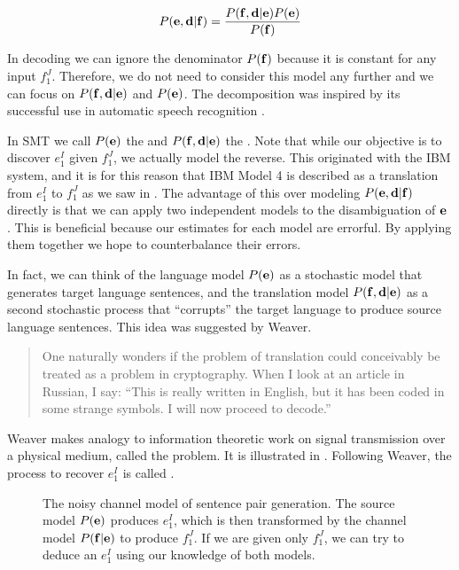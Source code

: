 \begin{equation}\label{eq:bayes}
P({\bf e},{\bf d}|{\bf f}) = \frac{P({\bf f},{\bf d}|{\bf e})P({\bf e})}{P({\bf f})}
\end{equation}

\noindent In decoding we can 
ignore the denominator $P({\bf f})$
because it is constant for any input $f_1^J$.  Therefore, we do not
need to consider this model any further and we can focus on 
$P({\bf f},{\bf d}|{\bf e})$ and $P({\bf e})$.
The decomposition was inspired by its successful
use in automatic speech recognition
\citep{Brown:1990:cl}.

In SMT we call $P({\bf e})$ the 
and $P({\bf f},{\bf d}|{\bf e})$ the .
Note that while our objective is to discover 
$e_1^I$ given $f_1^J$, we actually model the reverse.
This originated with the IBM 
system, and it is for this reason that IBM Model
4 is described as a translation from $e_1^I$ to
$f_1^J$ as we saw in .
The advantage of this over modeling 
$P({\bf e},{\bf d}|{\bf f})$ directly is that we can apply two
independent models to the disambiguation 
of ${\bf e}$ \citep{Brown:1990:cl}. 
This is beneficial because our estimates for each model 
are errorful.  By applying them together 
we hope to counterbalance
their errors.

In fact, we can think of the language model $P({\bf e})$ as
a stochastic model that generates target language sentences,
and the translation model $P({\bf f},{\bf d}|{\bf e})$ as a
second stochastic process that ``corrupts'' the target
language to produce source language sentences.
This idea was suggested by Weaver.

\begin{quotation}
\noindent One naturally wonders if the
problem of translation could conceivably be 
treated as a problem in cryptography.  When I 
look at an article in Russian, I say: ``This 
is really written in English, but it has been 
coded in some strange symbols.  I will now 
proceed to decode.'' \citep{Weaver:1955:mt}
\end{quotation}

\noindent Weaver makes analogy to information theoretic
work on signal transmission over a physical medium,
called the  problem.  
It is illustrated in .
Following Weaver, the
process to recover $e_1^I$ is called .

\figpreamble
\begin{figure*}[t]
\figfontsize{\begin{center}

\end{center}}
\figpostamble
\caption[The noisy channel model of sentence pair generation.]{\label{fig:noisy-channel}The noisy channel model 
of sentence pair generation.  The source model $P({\bf e})$ 
produces $e_1^I$, which is then transformed
by the channel model $P({\bf f}|{\bf e})$ to produce $f_1^J$.  
If we are given only $f_1^J$, we can try to deduce an $e_1^I$
using our knowledge of both models.}
\end{figure*}

